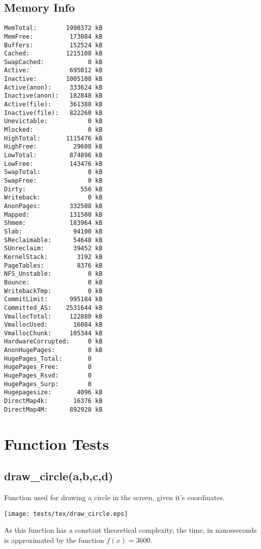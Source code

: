 \documentclass{article}
\begin{document}
\subsection{Memory Info}
\begin{verbatim}
MemTotal:        1990372 kB
MemFree:          173084 kB
Buffers:          152524 kB
Cached:          1215108 kB
SwapCached:            0 kB
Active:           695012 kB
Inactive:        1005108 kB
Active(anon):     333624 kB
Inactive(anon):   182848 kB
Active(file):     361388 kB
Inactive(file):   822260 kB
Unevictable:           0 kB
Mlocked:               0 kB
HighTotal:       1115476 kB
HighFree:          29608 kB
LowTotal:         874896 kB
LowFree:          143476 kB
SwapTotal:             0 kB
SwapFree:              0 kB
Dirty:               556 kB
Writeback:             0 kB
AnonPages:        332508 kB
Mapped:           131500 kB
Shmem:            183964 kB
Slab:              94100 kB
SReclaimable:      54648 kB
SUnreclaim:        39452 kB
KernelStack:        3192 kB
PageTables:         8376 kB
NFS_Unstable:          0 kB
Bounce:                0 kB
WritebackTmp:          0 kB
CommitLimit:      995184 kB
Committed_AS:    2531644 kB
VmallocTotal:     122880 kB
VmallocUsed:       16084 kB
VmallocChunk:     105344 kB
HardwareCorrupted:     0 kB
AnonHugePages:         0 kB
HugePages_Total:       0
HugePages_Free:        0
HugePages_Rsvd:        0
HugePages_Surp:        0
Hugepagesize:       4096 kB
DirectMap4k:       16376 kB
DirectMap4M:      892928 kB
\end{verbatim}
\section{Function Tests}
\subsection{draw\_circle(a,b,c,d)}
Function used for drawing a circle in the
screen, given it's coordinates. 

\texttt{[image: tests/tex/draw\_circle.eps]}

As this function has a constant theoretical
complexity, the time, in nanosseconds is 
approximated by the function $f(x)=3600$.
\end{document}
